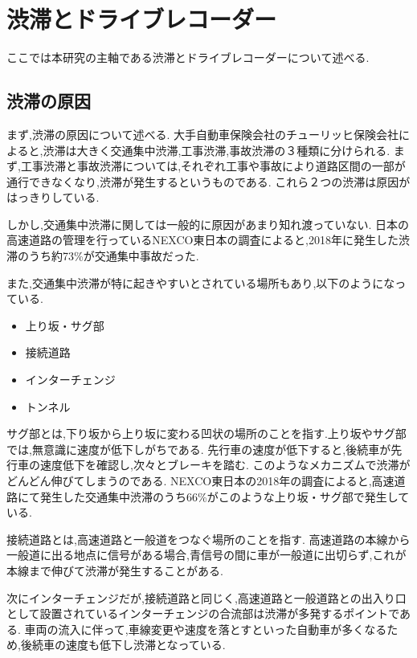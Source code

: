 \chapter{渋滞とドライブレコーダー}
ここでは本研究の主軸である渋滞とドライブレコーダーについて述べる.
\section{渋滞の原因}
まず,渋滞の原因について述べる.
大手自動車保険会社のチューリッヒ保険会社によると,渋滞は大きく交通集中渋滞,工事渋滞,事故渋滞の３種類に分けられる\cite{zurich}.
まず,工事渋滞と事故渋滞については,それぞれ工事や事故により道路区間の一部が通行できなくなり,渋滞が発生するというものである.
これら２つの渋滞は原因がはっきりしている.

しかし,交通集中渋滞に関しては一般的に原因があまり知れ渡っていない.
日本の高速道路の管理を行っているNEXCO東日本の調査によると,2018年に発生した渋滞のうち約73\%が交通集中事故だった\cite{NEXCOeast}.

また,交通集中渋滞が特に起きやすいとされている場所もあり,以下のようになっている.

\begin{itemize}
  \item 上り坂・サグ部
  \item 接続道路
  \item インターチェンジ
  \item トンネル
\end{itemize}

サグ部とは,下り坂から上り坂に変わる凹状の場所のことを指す.上り坂やサグ部では,無意識に速度が低下しがちである.
先行車の速度が低下すると,後続車が先行車の速度低下を確認し,次々とブレーキを踏む.
このようなメカニズムで渋滞がどんどん伸びてしまうのである.
NEXCO東日本の2018年の調査によると,高速道路にて発生した交通集中渋滞のうち66\%がこのような上り坂・サグ部で発生している\cite{NEXCOeast}.

接続道路とは,高速道路と一般道をつなぐ場所のことを指す.
高速道路の本線から一般道に出る地点に信号がある場合,青信号の間に車が一般道に出切らず,これが本線まで伸びて渋滞が発生することがある\cite{zurich}.

次にインターチェンジだが,接続道路と同じく,高速道路と一般道路との出入り口として設置されているインターチェンジの合流部は渋滞が多発するポイントである\cite{zurich}.
車両の流入に伴って,車線変更や速度を落とすといった自動車が多くなるため,後続車の速度も低下し渋滞となっている.

